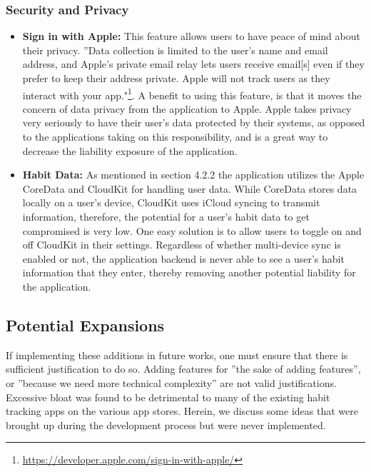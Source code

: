 \subsubsection{Security and Privacy}
\begin{itemize}
    \item \textbf{Sign in with Apple:} This feature allows users to have peace of mind about their privacy. ”Data collection is limited to the user’s name and email address, and Apple’s private email relay lets users receive email[s] even if they prefer to keep their address private. Apple will not track users as they interact with your app."\footnote{\url{https://developer.apple.com/sign-in-with-apple/}}. A benefit to using this feature, is that it moves the concern of data privacy from the application to Apple. Apple takes privacy very seriously to have their user’s data protected by their systems, as opposed to the applications taking on this responsibility, and is a great way to decrease the liability exposure of the application.
    \item \textbf{Habit Data:} As mentioned in section 4.2.2 the application utilizes the Apple CoreData and CloudKit for handling user data. While CoreData stores data locally on a user’s device, CloudKit uses iCloud syncing to transmit information, therefore, the potential for a user’s habit data to get compromised is very low. One easy solution is to allow users to toggle on and off CloudKit in their settings. Regardless of whether multi-device sync is enabled or not, the application backend is never able to see a user’s habit information that they enter, thereby removing another potential liability for the application.
\end{itemize}

\subsection{Potential Expansions}
If implementing these additions in future works, one must ensure that there is sufficient justification to do so. Adding features for ”the sake of adding features”, or ”because we need more technical complexity” are not valid justifications. Excessive bloat was found to be detrimental to many of the existing habit tracking apps on the various app stores. Herein, we discuss some ideas that were brought up during the development process but were never implemented.
